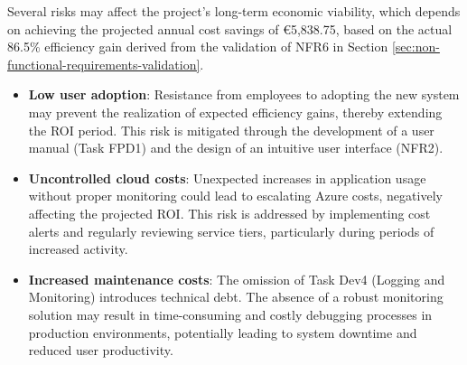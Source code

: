 Several risks may affect the project's long-term economic viability, which depends on achieving the projected annual cost savings of €5,838.75, based on the actual 86.5\% efficiency gain derived from the validation of NFR6 in Section \ref{sec:non-functional-requirements-validation}.

\begin{itemize} [leftmargin=0.75cm, noitemsep, label=$\bullet$]
    \item \textbf{Low user adoption}: Resistance from employees to adopting the new system may prevent the realization of expected efficiency gains, thereby extending the ROI period. This risk is mitigated through the development of a user manual (Task FPD1) and the design of an intuitive user interface (NFR2).

    \item \textbf{Uncontrolled cloud costs}: Unexpected increases in application usage without proper monitoring could lead to escalating Azure costs, negatively affecting the projected ROI. This risk is addressed by implementing cost alerts and regularly reviewing service tiers, particularly during periods of increased activity.

    \item \textbf{Increased maintenance costs}: The omission of Task Dev4 (Logging and Monitoring) introduces technical debt. The absence of a robust monitoring solution may result in time-consuming and costly debugging processes in production environments, potentially leading to system downtime and reduced user productivity.

\end{itemize}
